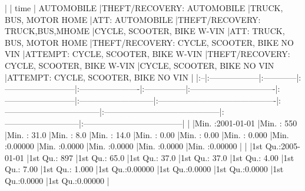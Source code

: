 \documentclass{article}
\begin{document}
\begin{Schunk}
\begin{Soutput}
|   |     time          |  AUTOMOBILE |THEFT/RECOVERY: AUTOMOBILE |TRUCK, BUS, MOTOR HOME |ATT: AUTOMOBILE |THEFT/RECOVERY: TRUCK,BUS,MHOME |CYCLE, SCOOTER, BIKE W-VIN |ATT: TRUCK, BUS, MOTOR HOME |THEFT/RECOVERY: CYCLE, SCOOTER, BIKE NO VIN |ATTEMPT: CYCLE, SCOOTER, BIKE W-VIN |THEFT/RECOVERY: CYCLE, SCOOTER, BIKE W-VIN |CYCLE, SCOOTER, BIKE NO VIN |ATTEMPT: CYCLE, SCOOTER, BIKE NO VIN |
|:--|:------------------|:------------|:--------------------------|:----------------------|:---------------|:-------------------------------|:--------------------------|:---------------------------|:-------------------------------------------|:-----------------------------------|:------------------------------------------|:---------------------------|:------------------------------------|
|   |Min.   :2001-01-01 |Min.   : 550 |Min.   : 31.0              |Min.   :  8.0          |Min.   : 14.0   |Min.   : 0.00                   |Min.   : 0.00              |Min.   : 0.000              |Min.   :0.00000                             |Min.   :0.0000                      |Min.   :0.0000                             |Min.   :0.0000              |Min.   :0.00000                      |
|   |1st Qu.:2005-01-01 |1st Qu.: 897 |1st Qu.: 65.0              |1st Qu.: 37.0          |1st Qu.: 37.0   |1st Qu.: 4.00                   |1st Qu.: 7.00              |1st Qu.: 1.000              |1st Qu.:0.00000                             |1st Qu.:0.0000                      |1st Qu.:0.0000                             |1st Qu.:0.0000              |1st Qu.:0.00000                      |

\end{Soutput}
\end{Schunk}
\end{document}
